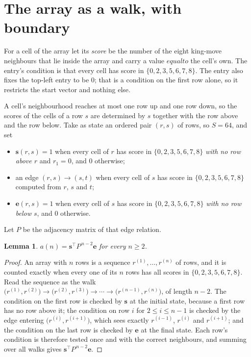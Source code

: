 \documentclass[11pt,a4paper]{article}
\theoremstyle{plain}
\newtheorem{lemma}[theorem]{Lemma}
\theoremstyle{definition}
\begin{document}
\section{The array as a walk, with boundary}

For a cell of the array let its \emph{score} be the number of the eight king-move neighbours that lie inside
the array and carry a value $equal to$ the cell's own. The entry's condition is that every cell
has score in $\{0,2,3,5,6,7,8\}$. The entry also fixes the top-left entry to be $0$; that is a condition on the first row alone, so it restricts the start vector and nothing else.

A cell's neighbourhood reaches at most one row up and one row down, so the scores of the
cells of a row $s$ are determined by $s$ together with the row above and the row below.
Take as state an ordered pair $(r,s)$ of rows, so $S=64$, and set
\begin{itemize}
\item $\mathbf{s}(r,s)=1$ when every cell of $r$ has score in $\{0,2,3,5,6,7,8\}$ \emph{with no row
above $r$} and $r_1=0$, and $0$ otherwise;
\item an edge $(r,s)\to(s,t)$ when every cell of $s$ has score in $\{0,2,3,5,6,7,8\}$ computed from
$r$, $s$ and $t$;
\item $\mathbf{e}(r,s)=1$ when every cell of $s$ has score in $\{0,2,3,5,6,7,8\}$ \emph{with no row
below $s$}, and $0$ otherwise.
\end{itemize}
Let $P$ be the adjacency matrix of that edge relation.

\begin{lemma}\label{lem:walk}
$a(n)=\mathbf{s}^{\!\top}P^{\,n-2}\mathbf{e}$ for every $n\ge2$.
\end{lemma}

\begin{proof}
An array with $n$ rows is a sequence $r^{(1)},\dots,r^{(n)}$ of rows, and it is counted
exactly when every one of its $n$ rows has all scores in $\{0,2,3,5,6,7,8\}$. Read the sequence as the
walk $\bigl(r^{(1)},r^{(2)}\bigr)\to\bigl(r^{(2)},r^{(3)}\bigr)\to\cdots\to
\bigl(r^{(n-1)},r^{(n)}\bigr)$, of length $n-2$. The condition on the first row is
checked by $\mathbf{s}$ at the initial state, because a first row has no row above it; the
condition on row $i$ for $2\le i\le n-1$ is checked by the edge entering
$\bigl(r^{(i)},r^{(i+1)}\bigr)$, which sees exactly $r^{(i-1)}$, $r^{(i)}$ and
$r^{(i+1)}$; and the condition on the last row is checked by $\mathbf{e}$ at the final
state. Each row's condition is therefore tested once and with the correct neighbours, and
summing over all walks gives $\mathbf{s}^{\!\top}P^{\,n-2}\mathbf{e}$.
\end{proof}
\end{document}
